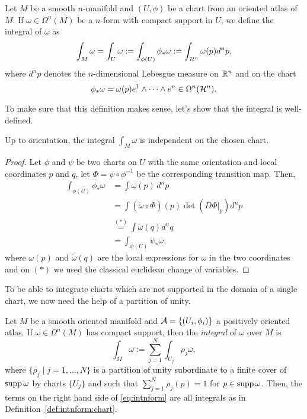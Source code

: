 \begin{definition}\label{def:intnform:chart}
  Let $M$ be a smooth $n$-manifold and $(U,\phi)$ be a chart from an oriented atlas of $M$.
  If $\omega\in\Omega^n(M)$ be a $n$-form with compact support in $U$, we define the integral of $\omega$ as
  \begin{equation}
    \int_M \omega = \int_U \omega := \int_{\phi(U)} \phi_*\omega := \int_{\mathcal{H}^n} \omega(p) d^n p,
  \end{equation}
  where $d^n p$ denotes the $n$-dimensional Lebesgue measure on $\mathbb{R}^n$ and on the chart
  \begin{equation}
    \phi_*\omega = \omega(p) e^1\wedge \cdots\wedge e^n\in\Omega^n(\mathcal{H}^n).
  \end{equation}
\end{definition}

To make sure that this definition makes sense, let's show that the integral is well-defined.

\begin{lemma}\label{lemma:intindep:chart}
  Up to orientation, the integral $\int_M\omega$ is independent on the chosen chart.
\end{lemma}
\begin{proof}
  Let $\phi$ and $\psi$ be two charts on $U$ with the same orientation and local coordinates $p$ and $q$, let $\Phi = \psi\circ\phi^{-1}$ be the corresponding transition map.
  Then,
  \begin{align}
    \int_{\phi(U)} \phi_*\omega & = \int \omega(p)\, d^n p \\
    &= \int (\widetilde\omega \circ \Phi)(p) \det(D\Phi|_p) d^n p \\
    &\overset{(*)}{=} \int \widetilde\omega(q) d^n q\\
    &= \int_{\psi(U)} \psi_*\omega,
  \end{align}
  where $\omega(p)$ and $\widetilde\omega(q)$ are the local expressions for $\omega$ in the two coordinates and on $(*)$ we used the classical euclidean change of variables.
\end{proof}

To be able to integrate charts which are not supported in the domain of a single chart, we now need the help of a partition of unity.

\begin{definition}
  Let $M$ be a smooth oriented manifold and $\mathcal{A} = \{(U_i,\phi_i)\}$ a positively oriented atlas.
  If $\omega \in \Omega^n(M)$ has compact support, then the \emph{integral} of $\omega$ over $M$ is
  \begin{equation}\label{eq:intnform}
    \int_M \omega := \sum_{j=1}^N \int_{U_j}\rho_j\omega,
  \end{equation}
  where $\{\rho_j\mid j=1,\ldots, N\}$ is a partition of unity subordinate to a finite cover of $\operatorname{supp} \omega$ by charts $\{U_j\}$ and such that $\sum_{j=1}^N \rho_j(p) = 1$ for $p\in\operatorname{supp}\omega$.
  Then, the terms on the right hand side of \eqref{eq:intnform} are all integrals as in Definition~\ref{def:intnform:chart}.
\end{definition}

